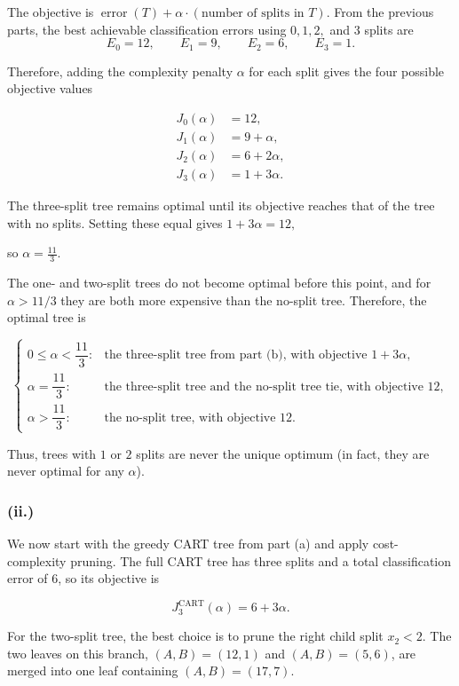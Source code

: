 \documentclass{article}
\begin{document}
The objective is $
\operatorname{error}(T)
+
\alpha\cdot(\text{number of splits in }T).
$ From the previous parts, the best achievable classification errors using $0,1,2,$ and $3$ splits are
$$
E_0=12,\qquad
E_1=9,\qquad
E_2=6,\qquad
E_3=1.
$$

Therefore, adding the complexity penalty $\alpha$ for each split gives the four possible objective values

$$
\begin{aligned}
J_0(\alpha) &= 12,\\
J_1(\alpha) &= 9+\alpha,\\
J_2(\alpha) &= 6+2\alpha,\\
J_3(\alpha) &= 1+3\alpha.
\end{aligned}
$$

The three-split tree remains optimal until its objective reaches that of the tree with no splits. Setting these equal gives $
1+3\alpha=12,
$ 

so $
\alpha=\frac{11}{3}.
$

The one- and two-split trees do not become optimal before this point, and for $\alpha>11/3$ they are both more expensive than the no-split tree. Therefore, the optimal tree is

$$
\begin{cases}
0\leq\alpha<\dfrac{11}{3}:&
\text{the three-split tree from part (b), with objective }1+3\alpha,\\[2mm]
\alpha=\dfrac{11}{3}:&
\text{the three-split tree and the no-split tree tie, with objective }12,\\[2mm]
\alpha>\dfrac{11}{3}:&
\text{the no-split tree, with objective }12.
\end{cases}
$$

Thus, trees with $1$ or $2$ splits are never the unique optimum (in fact, they are never optimal for any $\alpha$).

\newpage

\subsubsection*{(ii.)}

We now start with the greedy CART tree from part (a) and apply cost-complexity pruning. The full CART tree has three splits and a total classification error of $6$, so its objective is

$$
J_3^{\mathrm{CART}}(\alpha)=6+3\alpha.
$$

For the two-split tree, the best choice is to prune the right child split $x_2<2$. The two leaves on this branch, $(A,B)=(12,1)$ and $(A,B)=(5,6)$, are merged into one leaf containing $
(A,B)=(17,7).
$
\end{document}
